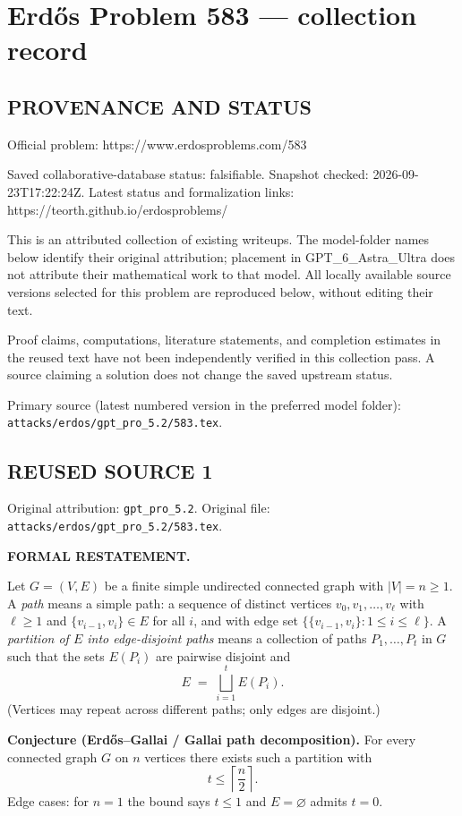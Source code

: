 \section*{Erd\H{o}s Problem 583 --- collection record}

\subsection*{PROVENANCE AND STATUS}
Official problem: https://www.erdosproblems.com/583

Saved collaborative-database status: falsifiable.
Snapshot checked: 2026-09-23T17:22:24Z.
Latest status and formalization links: https://teorth.github.io/erdosproblems/

This is an attributed collection of existing writeups. The model-folder names below identify their original attribution; placement in GPT\_6\_Astra\_Ultra does not attribute their mathematical work to that model. All locally available source versions selected for this problem are reproduced below, without editing their text.

Proof claims, computations, literature statements, and completion estimates in the reused text have not been independently verified in this collection pass. A source claiming a solution does not change the saved upstream status.

Primary source (latest numbered version in the preferred model folder): \texttt{attacks/erdos/gpt\_pro\_5.2/583.tex}.

\subsection*{REUSED SOURCE 1}
Original attribution: \texttt{gpt\_pro\_5.2}.
Original file: \texttt{attacks/erdos/gpt\_pro\_5.2/583.tex}.



\noindent\textbf{FORMAL RESTATEMENT.}

Let $G=(V,E)$ be a finite simple undirected connected graph with $|V|=n\ge 1$.
A \emph{path} means a simple path: a sequence of distinct vertices $v_0,v_1,\dots,v_\ell$ with $\ell\ge 1$ and $\{v_{i-1},v_i\}\in E$ for all $i$, and with edge set $\{\{v_{i-1},v_i\}:1\le i\le \ell\}$.
A \emph{partition of $E$ into edge-disjoint paths} means a collection of paths $P_1,\dots,P_t$ in $G$ such that the sets $E(P_i)$ are pairwise disjoint and
\[
E\;=\;\bigsqcup_{i=1}^t E(P_i).
\]
(Vertices may repeat across different paths; only edges are disjoint.)

\smallskip
\noindent\textbf{Conjecture (Erd\H{o}s--Gallai / Gallai path decomposition).}
For every connected graph $G$ on $n$ vertices there exists such a partition with
\[
 t\le \left\lceil \frac n2\right\rceil.
\]
Edge cases: for $n=1$ the bound says $t\le 1$ and $E=\varnothing$ admits $t=0$.

